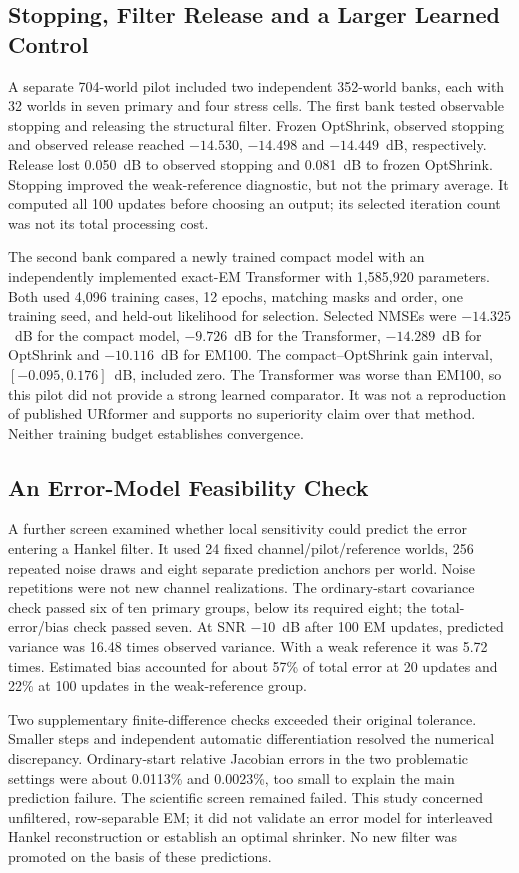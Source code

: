 \subsection{Stopping, Filter Release and a Larger Learned Control}
A separate 704-world pilot included two independent 352-world banks,
each with 32 worlds in seven primary and four stress cells. The first
bank tested observable stopping and releasing the structural filter.
Frozen OptShrink, observed stopping and observed release reached
$-14.530$, $-14.498$ and $-14.449$~dB, respectively. Release lost
0.050~dB to observed stopping and 0.081~dB to frozen OptShrink. Stopping
improved the weak-reference diagnostic, but not the primary average.
It computed all 100 updates before choosing an output; its selected
iteration count was not its total processing cost.

The second bank compared a newly trained compact model with an
independently implemented exact-EM Transformer with 1,585,920 parameters.
Both used 4,096 training cases, 12 epochs, matching masks and order,
one training seed, and held-out likelihood for selection. Selected
NMSEs were $-14.325$~dB for the compact model, $-9.726$~dB for the
Transformer, $-14.289$~dB for OptShrink and $-10.116$~dB for EM100.
The compact--OptShrink gain interval, $[-0.095,0.176]$~dB, included zero.
The Transformer was worse than EM100, so this pilot did not provide a
strong learned comparator. It was not a reproduction of published
URformer and supports no superiority claim over that method. Neither
training budget establishes convergence.

\subsection{An Error-Model Feasibility Check}
A further screen examined whether local sensitivity could predict the
error entering a Hankel filter. It used 24 fixed channel/pilot/reference
worlds, 256 repeated noise draws and eight separate prediction anchors
per world. Noise repetitions were not new channel realizations. The
ordinary-start covariance check passed six of ten primary groups,
below its required eight; the total-error/bias check passed seven.
At SNR $-10$~dB after 100 EM updates, predicted variance was 16.48
times observed variance. With a weak reference it was 5.72 times.
Estimated bias accounted for about 57\% of total error at 20 updates
and 22\% at 100 updates in the weak-reference group.

Two supplementary finite-difference checks exceeded their original
tolerance. Smaller steps and independent automatic differentiation
resolved the numerical discrepancy. Ordinary-start relative Jacobian
errors in the two problematic settings were about 0.0113\% and
0.0023\%, too small to explain the main prediction failure. The
scientific screen remained failed. This study concerned unfiltered,
row-separable EM; it did not validate an error model for interleaved
Hankel reconstruction or establish an optimal shrinker. No new filter
was promoted on the basis of these predictions.


